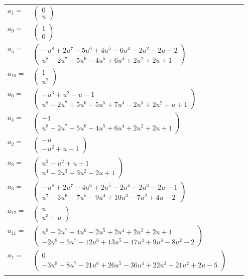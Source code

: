\documentclass[1p]{elsarticle_modified}
\theoremstyle{definition}
\begin{document}
\begin{tabular}{m{7pt} m{180pt} m{7pt} m{180pt} }
\flushright $a_{1}=$&$\begin{pmatrix}0\\u\end{pmatrix}$ \\
\flushright $a_{9}=$&$\begin{pmatrix}1\\0\end{pmatrix}$ \\
\flushright $a_{5}=$&$\begin{pmatrix}- u^8+2 u^7-5 u^6+4 u^5-6 u^4-2 u^2-2 u-2\\u^8-2 u^7+5 u^6-4 u^5+6 u^4+2 u^2+2 u+1\end{pmatrix}$ \\
\flushright $a_{10}=$&$\begin{pmatrix}1\\u^2\end{pmatrix}$ \\
\flushright $a_{6}=$&$\begin{pmatrix}- u^3+u^2- u-1\\u^8-2 u^7+5 u^6-5 u^5+7 u^4-2 u^3+2 u^2+u+1\end{pmatrix}$ \\
\flushright $a_{4}=$&$\begin{pmatrix}-1\\u^8-2 u^7+5 u^6-4 u^5+6 u^4+2 u^2+2 u+1\end{pmatrix}$ \\
\flushright $a_{2}=$&$\begin{pmatrix}- u\\- u^2+u-1\end{pmatrix}$ \\
\flushright $a_{8}=$&$\begin{pmatrix}u^3- u^2+u+1\\u^4-2 u^3+3 u^2-2 u+1\end{pmatrix}$ \\
\flushright $a_{3}=$&$\begin{pmatrix}- u^8+2 u^7-4 u^6+2 u^5-2 u^4-2 u^3-2 u-1\\u^7-3 u^6+7 u^5-9 u^4+10 u^3-7 u^2+4 u-2\end{pmatrix}$ \\
\flushright $a_{12}=$&$\begin{pmatrix}u\\u^3+u\end{pmatrix}$ \\
\flushright $a_{11}=$&$\begin{pmatrix}u^8-2 u^7+4 u^6-2 u^5+2 u^4+2 u^3+2 u+1\\-2 u^8+5 u^7-12 u^6+13 u^5-17 u^4+9 u^3-8 u^2-2\end{pmatrix}$ \\
\flushright $a_{7}=$&$\begin{pmatrix}0\\-3 u^8+8 u^7-21 u^6+26 u^5-36 u^4+22 u^3-21 u^2+2 u-5\end{pmatrix}$\\&\end{tabular}
\end{document}
